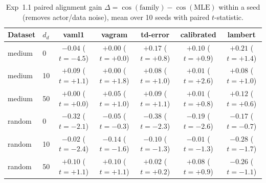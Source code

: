 \begin{table}[htbp]
\centering
\caption{Exp~1.1 paired alignment gain $\Delta = \cos(\text{family}) - \cos(\text{MLE})$ within a seed (removes actor/data noise), mean over 10 seeds with paired $t$-statistic.}
\label{tab:h11paired}
\begin{tabular}{llccccc}
\toprule
Dataset & $d_d$ & vaml1 & vagram & td-error & calibrated & lambert \\
\midrule
medium & 0 & $-0.04$ ($t=-4.5$) & $+0.00$ ($t=+0.0$) & $+0.17$ ($t=+0.8$) & $+0.10$ ($t=+0.9$) & $+0.21$ ($t=+1.4$) \\
medium & 10 & $+0.09$ ($t=+1.1$) & $+0.00$ ($t=+1.8$) & $+0.08$ ($t=+1.0$) & $+0.01$ ($t=+2.6$) & $+0.08$ ($t=+1.0$) \\
medium & 50 & $+0.00$ ($t=+0.0$) & $+0.05$ ($t=+1.0$) & $+0.09$ ($t=+1.1$) & $+0.01$ ($t=+0.8$) & $+0.12$ ($t=+0.6$) \\
random & 0 & $-0.32$ ($t=-2.1$) & $-0.05$ ($t=-0.3$) & $-0.38$ ($t=-2.3$) & $-0.19$ ($t=-2.6$) & $-0.17$ ($t=-0.7$) \\
random & 10 & $-0.02$ ($t=-2.4$) & $-0.14$ ($t=-1.6$) & $-0.10$ ($t=-1.3$) & $-0.01$ ($t=-1.3$) & $-0.28$ ($t=-1.7$) \\
random & 50 & $+0.10$ ($t=+1.1$) & $+0.10$ ($t=+1.1$) & $+0.02$ ($t=+0.2$) & $+0.08$ ($t=+0.9$) & $-0.26$ ($t=-1.1$) \\
\bottomrule
\end{tabular}
\end{table}
